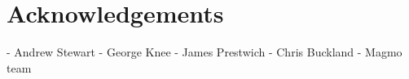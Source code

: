 \section{Acknowledgements}

- Andrew Stewart
- George Knee
- James Prestwich
- Chris Buckland
- Magmo team
